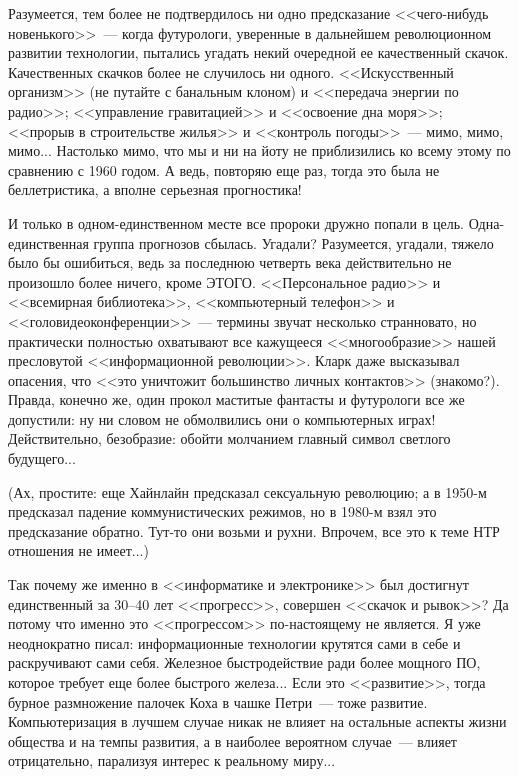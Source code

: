 \documentclass{scrbook}
\newcommand{\flqq}{<<}
\newcommand{\frqq}{>>}
\newcommand{\mdash}{~--- }
\newcommand{\ndash}{--}
\begin{document}
Разумеется, тем более не подтвердилось ни одно предсказание {\flqq}чего-нибудь новенького{\frqq}{\mdash}когда футурологи, уверенные в дальнейшем революционном развитии технологии, пытались угадать некий очередной ее качественный скачок. Качественных скачков более не случилось ни одного. {\flqq}Искусственный организм{\frqq} (не путайте с банальным клоном) и {\flqq}передача энергии по радио{\frqq}; {\flqq}управление гравитацией{\frqq} и {\flqq}освоение дна моря{\frqq}; {\flqq}прорыв в строительстве жилья{\frqq} и {\flqq}контроль погоды{\frqq}{\mdash}мимо, мимо, мимо... Настолько мимо, что мы и ни на йоту не приблизились ко всему этому по сравнению с 1960 годом. А ведь, повторяю еще раз, тогда это была не беллетристика, а вполне серьезная прогностика!

И только в одном-единственном месте все пророки дружно попали в цель. Одна-единственная группа прогнозов сбылась. Угадали? Разумеется, угадали, тяжело было бы ошибиться, ведь за последнюю четверть века действительно не произошло более ничего, кроме ЭТОГО. {\flqq}Персональное радио{\frqq} и {\flqq}всемирная библиотека{\frqq}, {\flqq}компьютерный телефон{\frqq} и {\flqq}головидеоконференции{\frqq}{\mdash}термины звучат несколько странновато, но практически полностью охватывают все кажущееся {\flqq}многообразие{\frqq} нашей пресловутой {\flqq}информационной революции{\frqq}. Кларк даже высказывал опасения, что {\flqq}это уничтожит большинство личных контактов{\frqq} (знакомо?). Правда, конечно же, один прокол маститые фантасты и футурологи все же допустили: ну ни словом не обмолвились они о компьютерных играх! Действительно, безобразие: обойти молчанием главный символ светлого будущего...

(Ах, простите: еще Хайнлайн предсказал сексуальную революцию; а в 1950-м предсказал падение коммунистических режимов, но в 1980-м взял это предсказание обратно. Тут-то они возьми и рухни. Впрочем, все это к теме НТР отношения не имеет...)

Так почему же именно в {\flqq}информатике и электронике{\frqq} был достигнут единственный за 30{\ndash}40 лет {\flqq}прогресс{\frqq}, совершен {\flqq}скачок и рывок{\frqq}? Да потому что именно это {\flqq}прогрессом{\frqq} по-настоящему не является. Я уже неоднократно писал: информационные технологии крутятся сами в себе и раскручивают сами себя. Железное быстродействие ради более мощного ПО, которое требует еще более быстрого железа... Если это {\flqq}развитие{\frqq}, тогда бурное размножение палочек Коха в чашке Петри{\mdash}тоже развитие. Компьютеризация в лучшем случае никак не влияет на остальные аспекты жизни общества и на темпы развития, а в наиболее вероятном случае{\mdash}влияет отрицательно, парализуя интерес к реальному миру...
\end{document}
